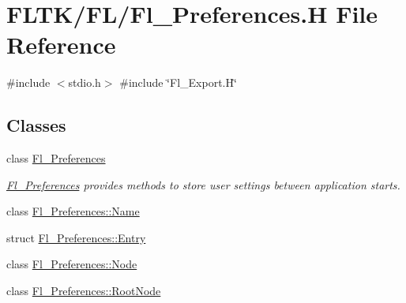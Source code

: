 \hypertarget{_fl___preferences_8_h}{}\section{F\+L\+T\+K/\+F\+L/\+Fl\+\_\+\+Preferences.H File Reference}
\label{_fl___preferences_8_h}
{\ttfamily \#include $<$stdio.\+h$>$}\newline
{\ttfamily \#include \char`\"{}Fl\+\_\+\+Export.\+H\char`\"{}}\newline
\subsection*{Classes}
\begin{DoxyCompactItemize}
\item 
class \hyperlink{class_fl___preferences}{Fl\+\_\+\+Preferences}
\begin{DoxyCompactList}\small\item\em \hyperlink{class_fl___preferences}{Fl\+\_\+\+Preferences} provides methods to store user settings between application starts. \end{DoxyCompactList}\item 
class \hyperlink{class_fl___preferences_1_1_name}{Fl\+\_\+\+Preferences\+::\+Name}
\item 
struct \hyperlink{struct_fl___preferences_1_1_entry}{Fl\+\_\+\+Preferences\+::\+Entry}
\item 
class \hyperlink{class_fl___preferences_1_1_node}{Fl\+\_\+\+Preferences\+::\+Node}
\item 
class \hyperlink{class_fl___preferences_1_1_root_node}{Fl\+\_\+\+Preferences\+::\+Root\+Node}
\end{DoxyCompactItemize}

